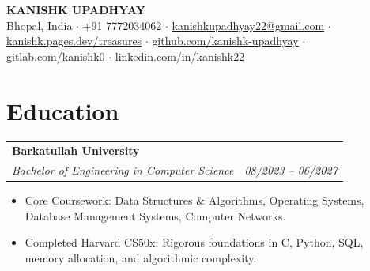 \documentclass[10pt,letterpaper]{article}
\begin{document}
\begin{center}
  {\LARGE \textbf{KANISHK UPADHYAY}} \\[2pt]
  {\small Bhopal, India $\cdot$ +91 7772034062 $\cdot$ \href{mailto:kanishkupadhyay22@gmail.com}{kanishkupadhyay22@gmail.com} $\cdot$ \href{https://kanishk.pages.dev/treasures}{kanishk.pages.dev/treasures} $\cdot$ \href{https://github.com/kanishk-upadhyay}{github.com/kanishk-upadhyay} $\cdot$ \href{https://gitlab.com/kanishk0}{gitlab.com/kanishk0} $\cdot$ \href{https://linkedin.com/in/kanishk22}{linkedin.com/in/kanishk22}}
\end{center}
\vspace{-4pt}

\section{Education}
\noindent\begin{tabular*}{\textwidth}{@{\extracolsep{\fill}}lr}
  \textbf{Barkatullah University} & \textit{} \\
  \textit{Bachelor of Engineering in Computer Science} & \textit{08/2023 -- 06/2027} \\
\end{tabular*}\vspace{-2pt}
\begin{itemize}
  \item Core Coursework: Data Structures \& Algorithms, Operating Systems, Database Management Systems, Computer Networks.
  \item Completed Harvard CS50x: Rigorous foundations in C, Python, SQL, memory allocation, and algorithmic complexity.
\end{itemize}\vspace{2pt}
\end{document}
